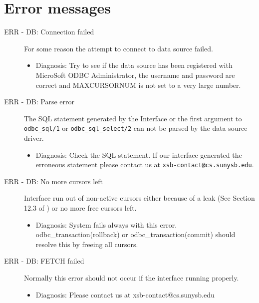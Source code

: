 \section{Error messages}
\begin{description}
\item[ERR - DB: Connection failed] For some reason the attempt to connect
	to data source failed.
	\begin{itemize}
	\item	Diagnosis: Try to see if the data source has been registered 
                                  with MicroSoft ODBC Administrator, the username and 
                                  password are correct and MAXCURSORNUM is not set 
                                  to a very large number.
	\end{itemize}

\item[ERR - DB: Parse error] The SQL statement generated by the
	                  Interface or the first argument to {\tt odbc\_sql/1} or 
	               {\tt odbc\_sql\_select/2} can not be parsed by the data 
                              source driver.
	\begin{itemize}
	\item	Diagnosis: Check the SQL statement.  If our interface
		generated the erroneous statement please contact us at
		{\tt xsb-contact@cs.sunysb.edu}.
	\end{itemize}

\item[ERR - DB: No more cursors left] Interface run out of non-active
                                               cursors either because of
a leak (See Section 12.3 of \cite{xsb-manual}) 
                                               or no more free cursors left.
\begin{itemize}

\item Diagnosis: System fails always with this error.  odbc\_transaction(rollback) or
	   odbc\_transaction(commit) should resolve this by freeing all cursors.
\end{itemize}

\item[ERR - DB: FETCH failed] Normally this error should not occur if the 
interface running properly.
\begin{itemize}

\item Diagnosis: Please contact us at xsb-contact@cs.sunysb.edu
\end{itemize}

\end{description}

